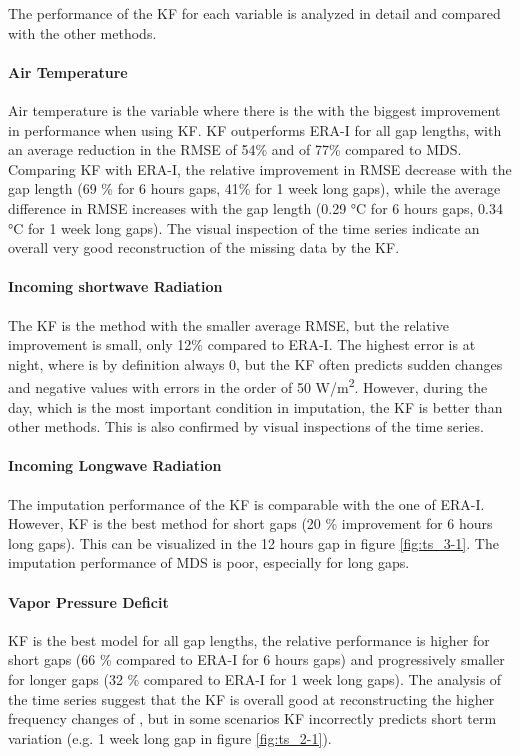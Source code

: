 \documentclass{article}
\begin{document}
The performance of the KF for each variable is analyzed in detail and compared with the other methods.

\paragraph{Air Temperature} Air temperature is the variable where there is the with the biggest improvement in performance when using KF. KF outperforms ERA-I for all gap lengths, with an average reduction in the RMSE of 54\% and of 77\% compared to MDS. Comparing KF with ERA-I, the relative improvement in RMSE decrease with the gap length (69 \% for 6 hours gaps, 41\% for 1 week long gaps), while the average difference in RMSE increases with the gap length (0.29 °C  for 6 hours gaps, 0.34 °C for 1 week long gaps).
The visual inspection of the time series indicate an overall very good reconstruction of the missing data by the KF. 

\paragraph{Incoming shortwave Radiation} The KF is the method with the smaller average RMSE, but the relative improvement is small, only 12\% compared to ERA-I. The highest error is at night, where  is by definition always 0, but the KF often predicts sudden changes and negative values with errors in the order of 50 \si{W/m^2}. However, during the day, which is the most important condition in  imputation, the KF is better than other methods. This is also confirmed by visual inspections of the time series.

\paragraph{Incoming Longwave Radiation} The imputation performance of the KF is comparable with the one of ERA-I. However, KF is the best method for short gaps (20 \% improvement for 6 hours long gaps). This can be visualized in the 12 hours gap in figure \ref{fig:ts_3-1}. The imputation performance of MDS is poor, especially for long gaps.

\paragraph{Vapor Pressure Deficit} KF is the best model for all gap lengths, the relative performance is higher for short gaps (66 \% compared to ERA-I for 6 hours gaps) and progressively smaller for longer gaps (32 \% compared to ERA-I for 1 week long gaps). The analysis of the time series suggest that the KF is overall good at reconstructing the higher frequency changes of , but in some scenarios KF incorrectly predicts short term variation (e.g. 1 week long gap in figure \ref{fig:ts_2-1}).
\end{document}
